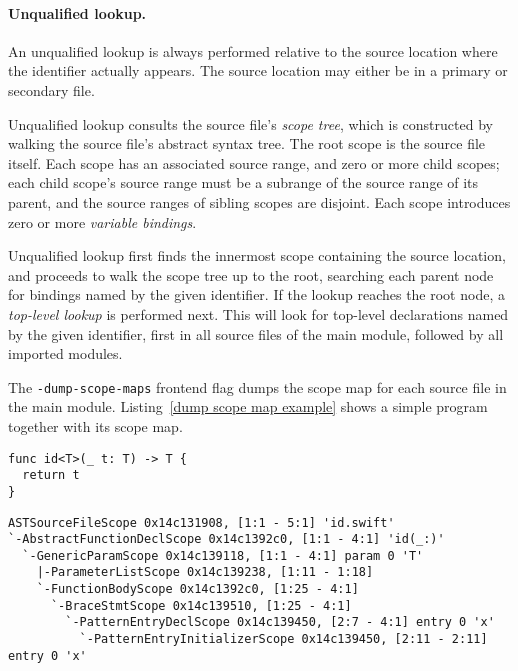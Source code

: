 \documentclass[../generics]{subfiles}
\begin{document}
\paragraph{Unqualified lookup.}
An unqualified lookup is always performed relative to the source location where the identifier actually appears. The source location may either be in a primary or secondary file.

Unqualified lookup consults the source file's \emph{scope tree}, which is constructed by walking the source file's abstract syntax tree. The root scope is the source file itself. Each scope has an associated source range, and zero or more child scopes; each child scope's source range must be a subrange of the source range of its parent, and the source ranges of sibling scopes are disjoint. Each scope introduces zero or more \emph{variable bindings}.

Unqualified lookup first finds the innermost scope containing the source location, and proceeds to walk the scope tree up to the root, searching each parent node for bindings named by the given identifier. If the lookup reaches the root node, a \emph{top-level lookup} is performed next. This will look for top-level declarations named by the given identifier, first in all source files of the main module, followed by all imported modules.

The \texttt{-dump-scope-maps} frontend flag dumps the scope map for each source file in the main module. Listing~\ref{dump scope map example} shows a simple program together with its scope map.

\begin{listing}\label{dump scope map example}
\begin{Verbatim}
func id<T>(_ t: T) -> T {
  return t
}
\end{Verbatim}
\begin{Verbatim}[fontsize=\scriptsize,numbers=none]
ASTSourceFileScope 0x14c131908, [1:1 - 5:1] 'id.swift'
`-AbstractFunctionDeclScope 0x14c1392c0, [1:1 - 4:1] 'id(_:)'
  `-GenericParamScope 0x14c139118, [1:1 - 4:1] param 0 'T'
    |-ParameterListScope 0x14c139238, [1:11 - 1:18] 
    `-FunctionBodyScope 0x14c1392c0, [1:25 - 4:1] 
      `-BraceStmtScope 0x14c139510, [1:25 - 4:1] 
        `-PatternEntryDeclScope 0x14c139450, [2:7 - 4:1] entry 0 'x'
          `-PatternEntryInitializerScope 0x14c139450, [2:11 - 2:11] entry 0 'x'
\end{Verbatim}
\end{listing}
\end{document}

